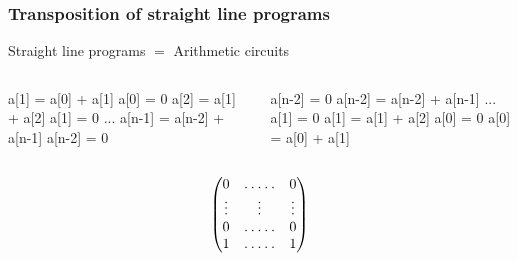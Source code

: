 \documentclass[10pt]{beamer}
\begin{document}
\begin{frame}[fragile]
  \frametitle{Transposition of straight line programs}

  \begin{center}
    \large
    Straight line programs $=$ Arithmetic circuits
  \end{center}

  \begin{columns}
    \begin{column}{0.5\textwidth}
      \begin{center}
        \begin{minipage}{0.7\textwidth}
\begin{semiverbatim}
  a[1] = a[0] + a[1]
  a[0] = 0
  a[2] = a[1] + a[2]
  a[1] = 0
  ...
  a[n-1] = a[n-2] + a[n-1]
  a[n-2] = 0
\end{semiverbatim}
        \end{minipage}
      \end{center}
    \end{column}

    \begin{column}{0.5\textwidth}
      \begin{center}
        \begin{minipage}{0.7\textwidth}
\begin{semiverbatim}
  a[n-2] = 0
  a[n-2] = a[n-2] + a[n-1]
  ...
  a[1] = 0
  a[1] = a[1] + a[2]
  a[0] = 0
  a[0] = a[0] + a[1]
\end{semiverbatim}
        \end{minipage}
      \end{center}
    \end{column}
    \end{columns}
  
  \vfill

  \begin{columns}
    \begin{column}{0.5\textwidth}
      \begin{equation*}
        \begin{pmatrix}
          0 & \hdotsfor{3} & 0\\
          \vdots  &  &\vdots&& \vdots \\
          0 & \hdotsfor{3} & 0\\
          1 & \hdotsfor{3} & 1
        \end{pmatrix}
      \end{equation*}
    \end{column}


\end{columns}
\end{frame}
\end{document}
